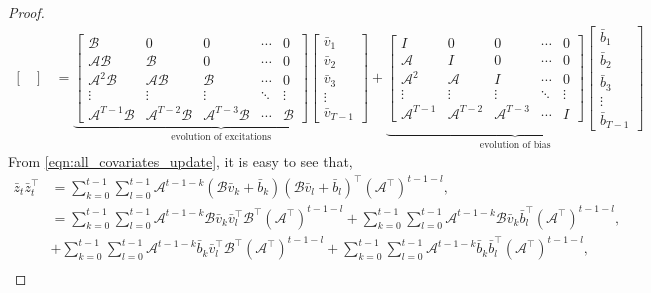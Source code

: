 \documentclass[11pt]{article}
\newcommand{\zbar}{\bar{z}}
\newcommand{\bbar}{\bar{b}}
\newcommand{\vbar}{\bar{v}}
\newcommand{\Acal}{\mathcal{A}}
\newcommand{\Bcal}{\mathcal{B}}
\newcommand{\nn}{\nonumber}
\newcommand{\T}{\top}
\newcommand{\<}{\langle}
\renewcommand{\>}{\rangle}
\numberwithin{equation}{section}
\begin{document}
\begin{proof}
\begin{align}
\begin{bmatrix}
    \end{bmatrix}
    &=
    \underbrace{\begin{bmatrix} 
    \Bcal & 0  & 0 &\cdots & 0 \\
    \Acal \Bcal & \Bcal & 0 &\cdots & 0 \\
    \Acal^2 \Bcal & \Acal \Bcal & \Bcal & \cdots & 0 \\
    \vdots & \vdots & \vdots & \ddots &\vdots \\
    \Acal^{T-1} \Bcal & \Acal^{T-2} \Bcal & \Acal^{T-3} \Bcal & \cdots & \Bcal 
    \end{bmatrix}
    \begin{bmatrix}
        \vbar_{1} \\ \vbar_{2} \\ \vbar_{3} \\ \vdots \\ \vbar_{T-1} 
    \end{bmatrix}}_{\text{evolution of excitations}}
    + 
    \underbrace{\begin{bmatrix} 
    I & 0  & 0 &\cdots & 0 \\
    \Acal & I & 0 &\cdots & 0 \\
    \Acal^2 & \Acal & I & \cdots & 0 \\
    \vdots & \vdots & \vdots & \ddots &\vdots \\
    \Acal^{T-1} & \Acal^{T-2} & \Acal^{T-3} & \cdots & I 
    \end{bmatrix}
    \begin{bmatrix}
        \bbar_{1} \\ \bbar_{2} \\ \bbar_{3} \\ \vdots \\ \bbar_{T-1} 
    \end{bmatrix}}_{\text{evolution of bias}} \label{eqn:all_covariates_update}
\end{align}
From \eqref{eqn:all_covariates_update}, it is easy to see that,
\begin{align}
    \zbar_t \zbar_t^\T &=  \sum_{k=0}^{t-1} \sum_{l=0}^{t-1}\Acal^{t-1-k} (\Bcal \vbar_k + \bbar_k) (\Bcal \vbar_l + \bbar_l)^\T (\Acal^\T)^{t-1-l}, \nn \\
    &= \sum_{k=0}^{t-1} \sum_{l=0}^{t-1}\Acal^{t-1-k} \Bcal \vbar_k \vbar_l^\T \Bcal^\T(\Acal^\T)^{t-1-l} + \sum_{k=0}^{t-1} \sum_{l=0}^{t-1}\Acal^{t-1-k} \Bcal \vbar_k \bbar_l^\T (\Acal^\T)^{t-1-l}, \nn \\
    &+ \sum_{k=0}^{t-1} \sum_{l=0}^{t-1}\Acal^{t-1-k} \bbar_k \vbar_l^\T \Bcal^\T(\Acal^\T)^{t-1-l} + \sum_{k=0}^{t-1} \sum_{l=0}^{t-1}\Acal^{t-1-k} \bbar_k \bbar_l^\T(\Acal^\T)^{t-1-l}, \nn \\

\end{align}
\end{proof}
\end{document}
